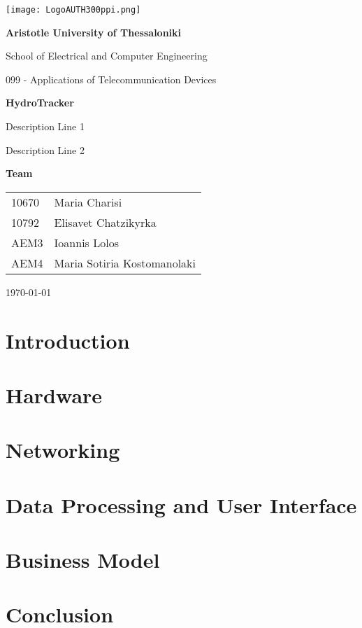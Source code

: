 \documentclass{article}
\begin{document}
\begin{titlepage}
    \centering
    \texttt{[image: LogoAUTH300ppi.png]}
    \par\vspace{2cm}

    {\Large \textbf{Aristotle University of Thessaloniki} \par}
    \vspace{0.5cm}
    {\large School of Electrical and Computer Engineering\par}
    {\large 099 - Applications of Telecommunication Devices\par}
    \vspace{3cm}

    {\Large \textbf{HydroTracker} \par}
    {\large Description Line 1 \par}
    {\large Description Line 2 \par}
    \vspace{3cm}

    {\large \textbf{Team} \par}
    \vspace{0.5cm}
    \begin{tabular}{ll}
    10670 & Maria Charisi \\
    10792 & Elisavet Chatzikyrka \\
    AEM3 & Ioannis Lolos\\
    AEM4 & Maria Sotiria Kostomanolaki \\
    \end{tabular}
    \par\vspace{3cm}

    {\today \par}
\end{titlepage}

\tableofcontents 

\newpage 

\section{Introduction}


\section{Hardware}


\section{Networking}


\section{Data Processing and User Interface}


\section{Business Model}


\section{Conclusion}

\end{document}
